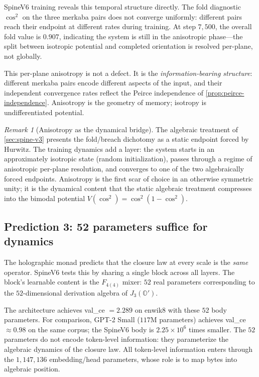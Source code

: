 \documentclass[11pt,a4paper]{article}
\theoremstyle{plain}
\theoremstyle{definition}
\theoremstyle{remark}
\newtheorem{remark}[theorem]{Remark}
\numberwithin{equation}{section}
\providecommand{\Os}{\mathbb{O}'}
\begin{document}
SpineV6 training reveals this temporal structure directly.  The
fold diagnostic $\cos^2$ on the three merkaba pairs does not
converge uniformly: different pairs reach their endpoint at
different rates during training.  At step $7{,}500$, the overall
fold value is $0.907$, indicating the system is still in the
anisotropic phase---the split between isotropic potential and
completed orientation is resolved per-plane, not globally.

This per-plane anisotropy is not a defect.  It is the
\emph{information-bearing structure}: different merkaba pairs
encode different aspects of the input, and their independent
convergence rates reflect the Peirce independence of
\cref{prop:peirce-independence}.  Anisotropy is the geometry of
memory; isotropy is undifferentiated potential.

\begin{remark}[Anisotropy as the dynamical bridge]
\label{rmk:anisotropy}
The algebraic treatment of \cref{sec:spine-v3} presents the
fold/breach dichotomy as a static endpoint forced by Hurwitz.
The training dynamics add a layer: the system starts in an
approximately isotropic state (random initialization), passes
through a regime of anisotropic per-plane resolution, and
converges to one of the two algebraically forced endpoints.
Anisotropy is the first scar of choice in an otherwise symmetric
unity; it is the dynamical content that the static algebraic
treatment compresses into the bimodal potential
$V(\cos^2) = \cos^2(1 - \cos^2)$.
\end{remark}

\subsection{Prediction 3: 52 parameters suffice for dynamics}

The holographic monad predicts that the closure law at every scale
is the \emph{same} operator.  SpineV6 tests this by sharing a
single block across all layers.  The block's learnable content is
the $F_{4(4)}$ mixer: $52$ real parameters corresponding to the
$52$-dimensional derivation algebra of $J_3(\Os)$.

The architecture achieves val\_ce $= 2.289$ on enwik8 with these
$52$ body parameters.  For comparison, GPT-2 Small ($117$M
parameters) achieves val\_ce $\approx 0.98$ on the same corpus;
the SpineV6 body is $2.25 \times 10^6$ times smaller.
The $52$ parameters do not encode token-level information: they
parameterize the algebraic dynamics of the closure law.  All
token-level information enters through the $1{,}147{,}136$
embedding/head parameters, whose role is to map bytes into
algebraic position.
\end{document}
